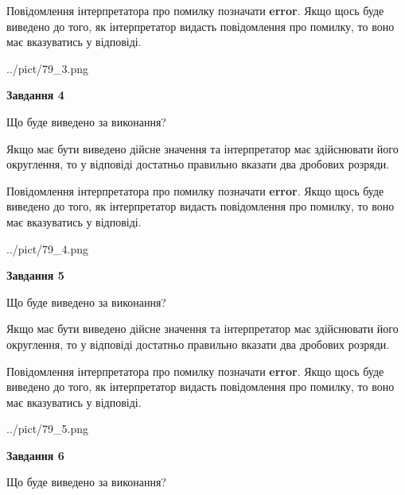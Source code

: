 \documentclass[12pt, ukrainian]{article}
\begin{document}
{\begin {Large}
Повідомлення інтерпретатора про помилку позначати \textbf{error}.
Якщо щось буде виведено до того, як інтерпретатор видасть повідомлення про помилку, 
то воно має вказуватись у відповіді. \par

\begin{center}
	{../pict/79_3.png}
\end{center}
\newpage

{\begin {center}\textbf{Завдання 4}\end {center}}\par
Що буде виведено за виконання? \par

Якщо має бути виведено дійсне значення та інтерпретатор має здійснювати його округлення, 
то у відповіді достатньо правильно вказати два дробових розряди.

Повідомлення інтерпретатора про помилку позначати \textbf{error}.
Якщо щось буде виведено до того, як інтерпретатор видасть повідомлення про помилку, 
то воно має вказуватись у відповіді. \par

\begin{center}
	{../pict/79_4.png}
\end{center}
\newpage

{\begin {center}\textbf{Завдання 5}\end {center}}\par
Що буде виведено за виконання? \par

Якщо має бути виведено дійсне значення та інтерпретатор має здійснювати його округлення, 
то у відповіді достатньо правильно вказати два дробових розряди.

Повідомлення інтерпретатора про помилку позначати \textbf{error}.
Якщо щось буде виведено до того, як інтерпретатор видасть повідомлення про помилку, 
то воно має вказуватись у відповіді. \par

\begin{center}
	{../pict/79_5.png}
\end{center}
\newpage

{\begin {center}\textbf{Завдання 6}\end {center}}\par
Що буде виведено за виконання? \par


\end{Large}}
\end{document}
